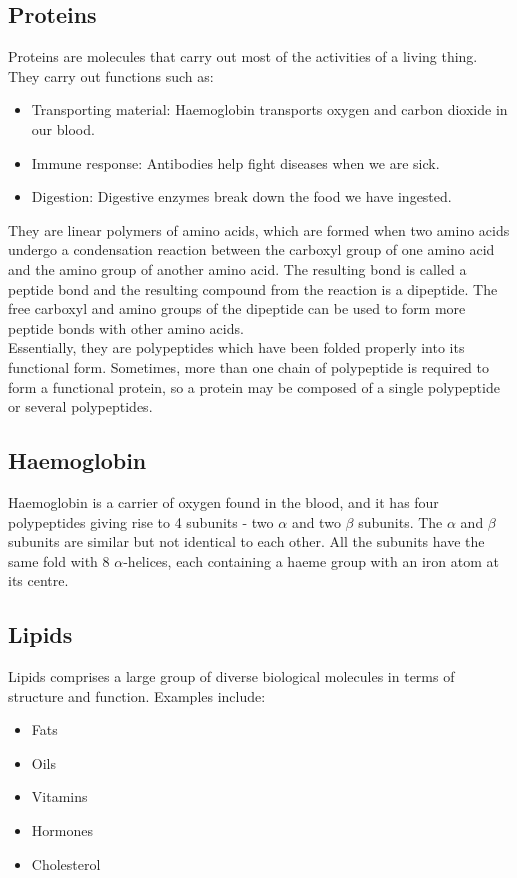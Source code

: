 \documentclass[11pt]{article}
\begin{document}
\subsection{Proteins}
\label{sec:org2718312}
Proteins are molecules that carry out most of the activities of a living thing. They carry out functions such as:
\begin{itemize}
\item Transporting material: Haemoglobin transports oxygen and carbon dioxide in our blood.
\item Immune response: Antibodies help fight diseases when we are sick.
\item Digestion: Digestive enzymes break down the food we have ingested.
\end{itemize}

They are linear polymers of amino acids, which are formed when two amino acids undergo a condensation reaction between the carboxyl group of one amino acid and the amino group of another amino acid. The resulting bond is called a peptide bond and the resulting compound from the reaction is a dipeptide. The free carboxyl and amino groups of the dipeptide can be used to form more peptide bonds with other amino acids.
\\[0pt]

Essentially, they are polypeptides which have been folded properly into its functional form. Sometimes, more than one chain of polypeptide is required to form a functional protein, so a protein may be composed of a single polypeptide or several polypeptides.

\subsection{Haemoglobin}
\label{sec:org7ea64ea}
Haemoglobin is a carrier of oxygen found in the blood, and it has four polypeptides giving rise to 4 subunits - two \(\alpha\) and two \(\beta\) subunits. The \(\alpha\) and \(\beta\) subunits are similar but not identical to each other. All the subunits have the same fold with 8 \(\alpha\)-helices, each containing a haeme group with an iron atom at its centre.

\newpage

\subsection{Lipids}
\label{sec:org2ce6551}
Lipids comprises a large group of diverse biological molecules in terms of structure and function. Examples include:
\begin{itemize}
\item Fats
\item Oils
\item Vitamins
\item Hormones
\item Cholesterol
\end{itemize}
\end{document}
